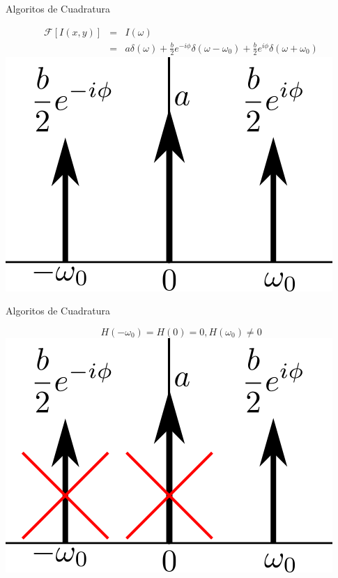\documentclass[]{beamer}
\begin{document}
\begin{frame}{Algoritos de Cuadratura}
\begin{center}

    \begin{eqnarray}
                      \mathcal{F}[I(x,y)] & = & I(\omega) \nonumber \\
                                                  & = & a\delta(\omega)+
                      \frac{b}{2}e^{-i \phi} \delta(\omega-\omega_0) +
                      \frac{b}{2} e^{i \phi} \delta(\omega+\omega_0)
    \end{eqnarray}
    \pause \includegraphics[scale=0.6]{Images/FourierDomine1.png}

\end{center}
\end{frame}
\begin{frame}{Algoritos de Cuadratura}
\begin{center}

  \begin{equation}
            H(-\omega_0) =H(0) = 0, H(\omega_0) \neq 0
  \end{equation}
  \pause \includegraphics[scale=0.6]{Images/FourierDomine2.png} 

\end{center}
\end{frame}
\end{document}
